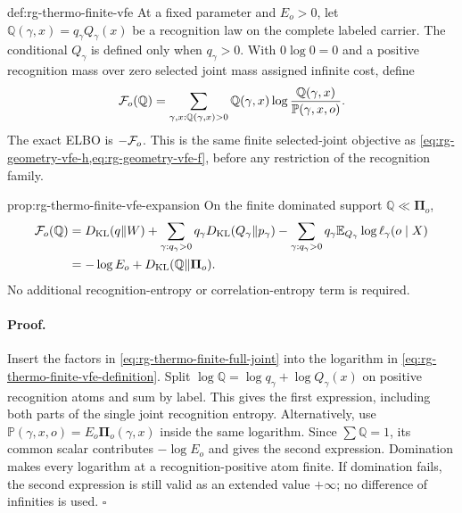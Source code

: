 {def:rg-thermo-finite-vfe}
At a fixed parameter and $E_o>0$, let
$\mathbb Q(\gamma,x)=q_\gamma Q_\gamma(x)$ be a recognition law on the
complete labeled carrier. The conditional $Q_\gamma$ is defined only
when $q_\gamma>0$. With $0\log0=0$ and a positive recognition mass over
zero selected joint mass assigned infinite cost, define
\begin{equation}
 \mathcal F_o(\mathbb Q)
 =\sum_{\gamma,x:\mathbb Q(\gamma,x)>0}
 \mathbb Q(\gamma,x)
 \log\frac{\mathbb Q(\gamma,x)}{\mathbb P(\gamma,x,o)}.
 \label{eq:rg-thermo-finite-vfe-definition}
\end{equation}
The exact ELBO is $-\mathcal F_o$. This is the same finite selected-joint
objective as \cref{eq:rg-geometry-vfe-h,eq:rg-geometry-vfe-f}, before any
restriction of the recognition family. 

{prop:rg-thermo-finite-vfe-expansion}
On the finite dominated support $\mathbb Q\ll\boldsymbol\Pi_o$,
\begin{align}
 \mathcal F_o(\mathbb Q)
 &=D_{\mathrm{KL}}(q\Vert W)+\sum_{\gamma:q_\gamma>0}q_\gamma
       D_{\mathrm{KL}}(Q_\gamma\Vert p_\gamma)
   -\sum_{\gamma:q_\gamma>0}q_\gamma
       \mathbb E_{Q_\gamma}\log\ell_\gamma(o\mid X)
 \label{eq:rg-thermo-finite-vfe-expansion}\\
 &=-\log E_o+D_{\mathrm{KL}}(\mathbb Q\Vert\boldsymbol\Pi_o).
 \label{eq:rg-thermo-finite-vfe-posterior}
\end{align}
No additional recognition-entropy or correlation-entropy term is required.\thermoestablishedstatus


\paragraph{Proof.}
Insert the factors in \cref{eq:rg-thermo-finite-full-joint} into the
logarithm in \cref{eq:rg-thermo-finite-vfe-definition}. Split
$\log\mathbb Q=\log q_\gamma+\log Q_\gamma(x)$ on positive
recognition atoms and sum by label. This gives the first expression,
including both parts of the single joint recognition entropy. Alternatively,
use $\mathbb P(\gamma,x,o)=E_o\boldsymbol\Pi_o(\gamma,x)$ inside
the same logarithm. Since $\sum\mathbb Q=1$, its common scalar contributes
$-\log E_o$ and gives the second expression. Domination makes every
logarithm at a recognition-positive atom finite. If domination fails, the
second expression is still valid as an extended value $+\infty$; no
difference of infinities is used. $\square$

